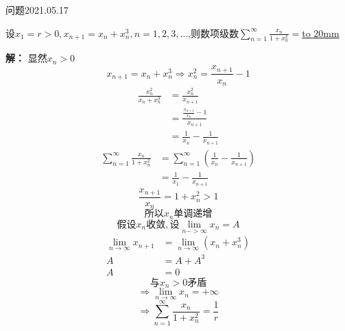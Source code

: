 \begin{mybox}{问题2021.05.17}
	
	\qquad 设$x_{1}=r>0,x_{n+1}=x_{n}+x_{n}^{3},n=1,2,3,\dots $,则数项级数$\sum\limits_{n=1}^{\infty} \frac{x_{n}}{1+x_{n}^2}=$\underline{\hbox to 20mm{}}
\end{mybox}
\noindent
\textbf{解：}
显然$x_{n}>0$
$$x_{n+1}=x_{n}+x_{n}^{3}\Rightarrow x_{n}^{2}=\frac{x_{n+1}}{x_{n}} -1$$
\begin{align*}
	\frac{x_{n}^2}{x_{n}+x_{n}^{3}}&=\frac{x_{n}^2}{x_{n+1}}\\
	&=\frac{\frac{x_{n+1}}{x_{n}}-1}{x_{n+1}}\\
	&=\frac{1}{x_{n}}-\frac{1}{x_{n+1}}
\end{align*}
\begin{align*}
	\sum\limits_{n=1}^{\infty} \frac{x_{n}}{1+x_{n}^2}&=\sum\limits_{n=1}^{\infty}(\frac{1}{x_{n}}-\frac{1}{x_{n+1}})\\
	&=\frac{1}{x_{1}}-\frac{1}{x_{n+1}}
\end{align*}
$$\frac{x_{n+1}}{x_{n}}=1+x_{n}^2>1$$
$$\text{所以}x_{n}\text{单调递增}$$
$$\text{假设}x_{n}\text{收敛},\text{设}\lim\limits_{n->\infty} x_{n}=A$$
\begin{align*}
	\lim \limits_{n\to\infty} x_{n+1}&=\lim\limits_{n\to\infty} (x_{n}+x_{n}^3)\\
	A&=A+A^3\\
	A&=0
\end{align*}
$$\text{与}x_{n}>0\text{矛盾}$$
$$\Rightarrow \lim\limits_{n\to\infty} x_{n}=+\infty$$
$$\Rightarrow \sum\limits_{n=1}^{\infty} \frac{x_{n}}{1+x_{n}^2}=\frac{1}{r}$$